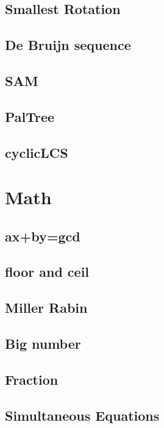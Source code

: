 \subsection{Smallest Rotation}

\subsection{De Bruijn sequence}

\subsection{SAM}

\subsection{PalTree}

\subsection{cyclicLCS}



\section{Math}
\subsection{ax+by=gcd}

\subsection{floor and ceil}

\subsection{Miller Rabin}

\subsection{Big number}

\subsection{Fraction}

\subsection{Simultaneous Equations}


